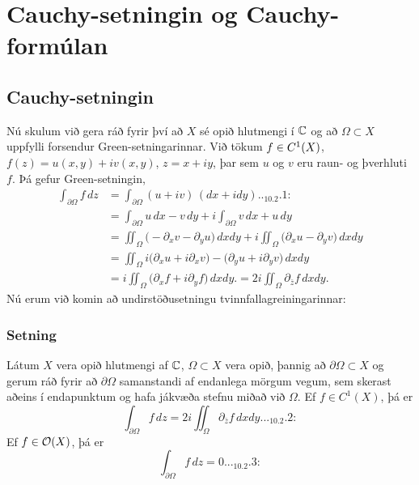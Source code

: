  
\section {Cauchy-setningin og Cauchy-formúlan}

\subsection*{Cauchy-setningin}

Nú skulum við gera ráð fyrir því að $X$ sé opið hlutmengi í ${\mathbb C}$ og
að $\Omega\subset X$ uppfylli forsendur Green-setningarinnar.  Við
tökum $f\in C\sp 1(X)$, $f(z)=u(x,y)+iv(x,y)$, $z=x+iy$, þar sem $u$ og
$v$ eru raun-  og  þverhluti $f$.
Þá gefur Green-setningin,
\begin{align*}
\int_{\partial\Omega} f\, dz 
&=\int_{\partial\Omega} (u+iv)\, (dx+idy)

.. _10.2.1:
\\
&=\int_{\partial\Omega} u\, dx - v\, dy
+i\int_{\partial\Omega} v\, dx + u\, dy\nonumber\\
&=\iint_{\Omega}\big(-\partial_x v-\partial_y u\big) \, dxdy
+i\iint_{\Omega}\big(\partial_x u-\partial_y v\big) \, dxdy\nonumber\\
&=\iint_{\Omega}i\big(\partial_x u+i\partial_x v\big)-
\big(\partial_y u+i\partial_y v \big) \, dxdy \nonumber\\
&=i\iint_{\Omega}\big(\partial_x f+i\partial_y f\big) \, dxdy.
=2i\iint_{\Omega}\partial_{\bar z} f \, dxdy.\nonumber
\end{align*}
Nú erum við komin að undirstöðusetningu tvinnfallagreiningarinnar:

\subsubsection{Setning}
Látum $X$ vera opið hlutmengi af ${\mathbb C}$, $\Omega\subset X$ vera opið,
þannig að $\partial\Omega\subset X$ og gerum ráð fyrir að
$\partial\Omega$ samanstandi af endanlega mörgum vegum, sem skerast
aðeins í endapunktum og hafa jákvæða stefnu miðað við ${\Omega}$.
Ef $f\in C^1(X)$, þá er
\begin{equation*}\int_{\partial\Omega}f\, dz = 
2i\iint_{\Omega}\partial_{\bar z} f \, dxdy.


.. _10.2.2:

\end{equation*}
Ef $f\in {\cal O}(X)$, þá er
\begin{equation*}
\int_{\partial\Omega}f\, dz = 0.


.. _10.2.3:

\end{equation*}


